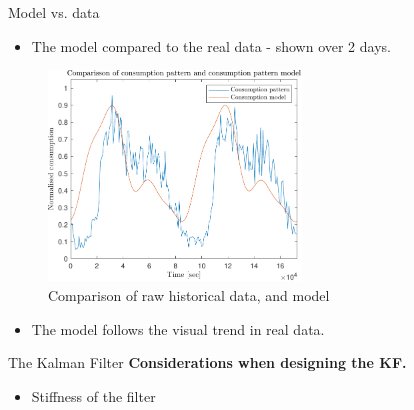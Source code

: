 	\begin{frame}{Model vs. data}
\begin{itemize}
		\item The model compared to the real data - shown over 2 days. 
\end{itemize}
		\begin{figure}[h!]
			\centering
			\includegraphics[width=0.6\textwidth]{Topics/KalmanEstimator/Graphics/Comparisson.pdf}
			\caption{Comparison of raw historical data, and model}
			\label{fig:Comparison}
		\end{figure}
	\begin{itemize}
		\item The model follows the visual trend in real data.
	\end{itemize}	
	\end{frame}

\begin{frame}{The Kalman Filter}
	\textbf{Considerations when designing the KF.}
	\begin{itemize}
		\item Stiffness of the filter
	\end{itemize}
\end{frame}